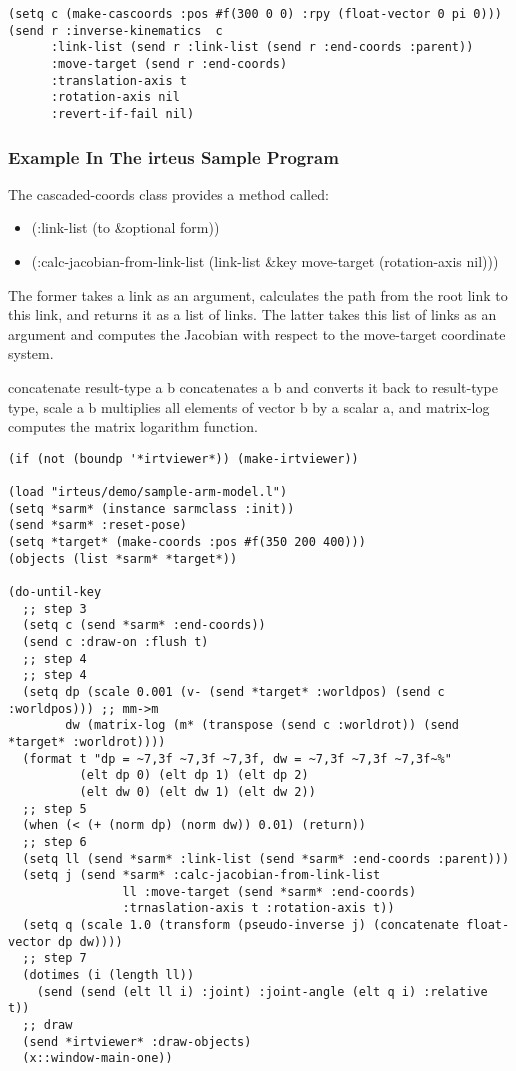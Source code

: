 {\baselineskip=10pt
\begin{verbatim}
(setq c (make-cascoords :pos #f(300 0 0) :rpy (float-vector 0 pi 0)))
(send r :inverse-kinematics  c
      :link-list (send r :link-list (send r :end-coords :parent))
      :move-target (send r :end-coords)
      :translation-axis t
      :rotation-axis nil
      :revert-if-fail nil)
\end{verbatim}
}

\subsubsection{Example In The irteus Sample Program}

The cascaded-coords class provides a method called:
\begin{itemize}
\item (:link-list (to \&optional form))
\item (:calc-jacobian-from-link-list (link-list \&key move-target
  (rotation-axis nil)))
\end{itemize}


The former takes a link as an argument, calculates the path from the root link to this link, and returns it as a list of links. The latter takes this list of links as an argument and computes the Jacobian with respect to the move-target coordinate system.

concatenate result-type a b concatenates a b and converts it back to result-type type, scale a b multiplies all elements of vector b by a scalar a, and matrix-log computes the matrix logarithm function.

{\baselineskip=10pt
\begin{verbatim}
(if (not (boundp '*irtviewer*)) (make-irtviewer))

(load "irteus/demo/sample-arm-model.l")
(setq *sarm* (instance sarmclass :init))
(send *sarm* :reset-pose)
(setq *target* (make-coords :pos #f(350 200 400)))
(objects (list *sarm* *target*))

(do-until-key
  ;; step 3
  (setq c (send *sarm* :end-coords))
  (send c :draw-on :flush t)
  ;; step 4
  ;; step 4
  (setq dp (scale 0.001 (v- (send *target* :worldpos) (send c :worldpos))) ;; mm->m
        dw (matrix-log (m* (transpose (send c :worldrot)) (send *target* :worldrot))))
  (format t "dp = ~7,3f ~7,3f ~7,3f, dw = ~7,3f ~7,3f ~7,3f~%"
          (elt dp 0) (elt dp 1) (elt dp 2)
          (elt dw 0) (elt dw 1) (elt dw 2))
  ;; step 5
  (when (< (+ (norm dp) (norm dw)) 0.01) (return))
  ;; step 6
  (setq ll (send *sarm* :link-list (send *sarm* :end-coords :parent)))
  (setq j (send *sarm* :calc-jacobian-from-link-list
                ll :move-target (send *sarm* :end-coords)
                :trnaslation-axis t :rotation-axis t))
  (setq q (scale 1.0 (transform (pseudo-inverse j) (concatenate float-vector dp dw))))
  ;; step 7
  (dotimes (i (length ll))
    (send (send (elt ll i) :joint) :joint-angle (elt q i) :relative t))
  ;; draw
  (send *irtviewer* :draw-objects)
  (x::window-main-one))
\end{verbatim}
}

